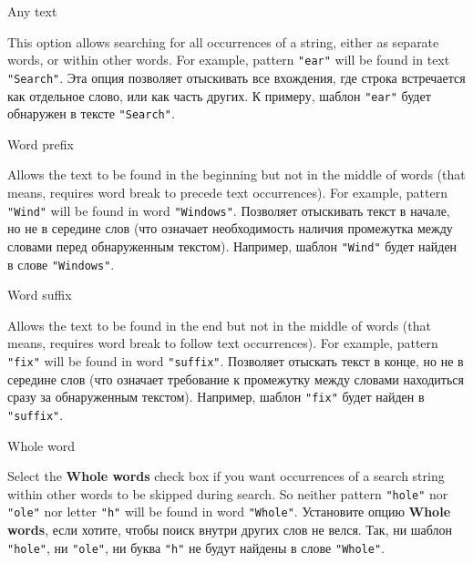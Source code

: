 \begin{popup}
\caption{Any text}

\ifenglish
This option allows searching for all occurrences of a string, either
as separate words, or within other words. For example, pattern {\tt "ear"} will
be found in text {\tt "Search"}.
\else
Эта опция позволяет отыскивать все вхождения, где строка встречается
как отдельное слово, или как часть других. К примеру, шаблон {\tt "ear"} 
будет обнаружен в тексте {\tt "Search"}.
\fi
\end{popup}

\begin{popup}
\caption{Word prefix}

\ifenglish
Allows the text to be found in the beginning but not in the middle of words
(that means, requires word break to precede text occurrences). For example,
pattern {\tt "Wind"} will be found in word {\tt"Windows"}.
\else
Позволяет отыскивать текст в начале, но не в середине слов (что означает
необходимость наличия промежутка между словами перед обнаруженным текстом).
Например, шаблон {\tt "Wind"} будет найден в слове {\tt"Windows"}. 
\fi
\end{popup}

\begin{popup}
\caption{Word suffix}

\ifenglish
Allows the text to be found in the end but not in the middle of words
(that means, requires word break to follow text occurrences). For example,
pattern {\tt "fix"} will be found in word {\tt"suffix"}.
\else
Позволяет отыскать текст в конце, но не в середине слов (что означает
требование к промежутку между словами находиться сразу за обнаруженным 
текстом). Например, шаблон {\tt "fix"} будет найден в {\tt"suffix"}.
\fi
\end{popup}

\begin{popup}
\caption{Whole word}


\ifenglish
Select the {\bf Whole words} check box if you want occurrences of a search
string within other words to be skipped during search.
So neither pattern {\tt "hole"} nor {\tt "ole"} nor letter {\tt "h"}
will be found in word {\tt "Whole"}.
\else
Установите опцию {\bf Whole words}, если хотите, чтобы поиск внутри 
других слов не велся. Так, ни шаблон {\tt "hole"}, ни {\tt "ole"}, ни буква 
{\tt "h"} не будут найдены в слове {\tt "Whole"}.
\fi
\end{popup}

